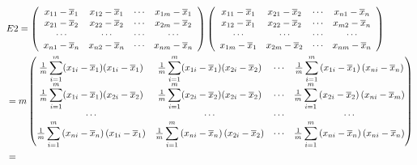 \documentclass[12pt,a4paper]{article}
\begin{document}
\begin{enumerate}
\begin{enumerate}
{\begin{equation}
\begin{aligned}
\notag
	&	E2 = \left( \begin{array}{cccc}{
			x_{11}-\overline{x}_{1}} & {x_{12}-\overline{x}_{1}} & {\cdots} & {x_{1 m}-\overline{x}_{1}} \\ 
		{x_{21}-\overline{x}_{2}} & {x_{22}-\overline{x}_{2}} & {\cdots} & {x_{2 m}-\overline{x}_{2}} \\ 
		{\cdots} & {\cdots} & {\cdots} & {\cdots} \\ 
		{x_{n 1}-\overline{x}_{n}} & {x_{n 2}-\overline{x}_{n}} & {\cdots} & {x_{n m}-\overline{x}_{n}}\end{array}\right) \left( \begin{array}{cccc}{x_{11}-\overline{x}_{1}} & {x_{21}-\overline{x}_{2}} & {\cdots} & {x_{n 1}-\overline{x}_{n}} \\ {x_{12}-\overline{x}_{1}} & {x_{22}-\overline{x}_{2}} & {\cdots} & {x_{m 2}-\overline{x}_{n}} \\ {\cdots} & {\cdots} & {\cdots} & {\cdots} \\ {x_{1 m}-\overline{x}_{1}} & {x_{2 m}-\overline{x}_{2}} & {\cdots} & {x_{n m}-\overline{x}_{n}}\end{array}\right)\\ 
		&=m \begin{pmatrix}	
		\frac{1}{m} \displaystyle\sum_{i=1}^{m}	(x_{1i}-\overline{x}_{1}	)(x_{1i}-\overline{x}_{1}	)&\frac{1}{m} \displaystyle\sum_{i=1}^{m}(x_{1i}-\overline{x}_{1}	)(x_{2i}-\overline{x}_{2}	)&\cdots&\frac{1}{m} \displaystyle\sum_{i=1}^{m}\left(x_{1 i}-\overline{x}_{1}\right)\left(x_{n i}-\overline{x}_{n}\right)\\ 
		\frac{1}{m} \displaystyle\sum_{i=1}^{m}(x_{1i}-\overline{x}_{1}	)(x_{2i}-\overline{x}_{2})&\frac{1}{m} \displaystyle\sum_{i=1}^{m}(x_{2i}-\overline{x}_{2}	)(x_{2i}-\overline{x}_{2}	)&\cdots&\frac{1}{m} \displaystyle\sum_{i=1}^{m}\left(x_{2 i}-\overline{x}_{2}\right)\left(x_{n i}-\overline{x}_{m}\right)\\ 
		\cdots & \cdots & \cdots & \cdots \\
		\frac{1}{m} \displaystyle\sum_{i=1}^{m}\left(x_{n i}-\overline{x}_{n}\right)\left(x_{1 i}-\overline{x}_{1}\right)&\frac{1}{m} \displaystyle\sum_{i=1}^{m}\left(x_{n i}-\overline{x}_{n}\right)\left(x_{2 i}-\overline{x}_{2}\right)&\cdots&\frac{1}{m} \displaystyle\sum_{i=1}^{m}\left(x_{n i}-\overline{x}_{n}\right)\left(x_{n i}-\overline{x}_{n}\right)\end{pmatrix}\\ &=

\end{aligned}
\end{equation}}
\end{enumerate}
\end{enumerate}
\end{document}
